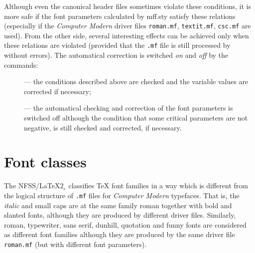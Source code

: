 Although even the canonical header files sometimes
violate these conditions,
it is more safe if the font parameters calculated by {\sc mff.sty}
satisfy these relations (especially if the {\sl Computer Modern}
driver files {\tt roman.mf}, {\tt textit.mf}, {\tt csc.mf} are used).
From the other side, several interesting effects can be achieved only
when these relations are violated (provided that the {\tt .mf} file
is still processed by \MF{} without errors).
The automatical correction is switched {\em on} and {\em off}
by the commands:
\begin{description}
\item[] --- the conditions described above
are checked and the variable values are corrected if necessary;
\item[] --- the automatical checking
and correction of the font parameters is switched off although
the condition that some critical parameters
are not negative, is still checked and corrected, if necessary.
\end{description}

\section{Font classes\label{CLASS}}

The NFSS/\LaTeX$2_{\varepsilon}$ classifies \TeX{} font
families in a way which is different from the logical structure
of {\tt .mf} files for {\sl Computer Modern} typefaces.
That is, the {\em italic} and {\sc small caps}
are at the same family {\cmcmr roman} together with
{\cmcmbx bold} and {\cmcmsl slanted} fonts, although they are produced
by different driver files. Similarly, {\cmcmr roman},
{\cmcmtt typewriter}, {\cmcmss sans serif}, {\cmdunh dunhill},
{\cmquote quotation} and {\cmfunny funny} fonts are considered
as different font families
although they are produced by the same driver file {\tt roman.mf}
(but with different font parameters).

